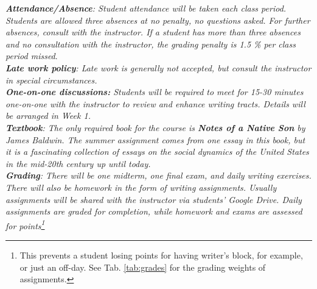 \documentclass[10pt]{article}
\begin{document}
\textit{\textbf{Attendance/Absence}: Student attendance will be taken each class period.  Students are allowed three absences at no penalty, no questions asked.  For further absences, consult with the instructor.  If a student has more than three absences and no consultation with the instructor, the grading penalty is 1.5 \% per class period missed}.\\ 
\textit{\textbf{Late work policy}: Late work is generally not accepted, but consult the instructor in special circumstances.} \\
\textit{\textbf{One-on-one discussions:} Students will be required to meet for 15-30 minutes one-on-one with the instructor to review and enhance writing tracts.  Details will be arranged in Week 1.} \\
\textit{\textbf{Textbook}: The only required book for the course is \textit{\textbf{Notes of a Native Son} by James Baldwin}.  The summer assignment comes from one essay in this book, but it is a fascinating collection of essays on the social dynamics of the United States in the mid-20th century up until today.} \\
\textit{\textbf{Grading}: There will be one midterm, one final exam, and daily writing exercises.  There will also be homework in the form of writing assignments.  Usually assignments will be shared with the instructor via students' Google Drive.  Daily assignments are graded for completion, while homework and exams are assessed for points\footnote{This prevents a student losing points for having writer's block, for example, or just an off-day.  See Tab. \ref{tab:grades} for the grading weights of assignments.}} \\
\end{document}
